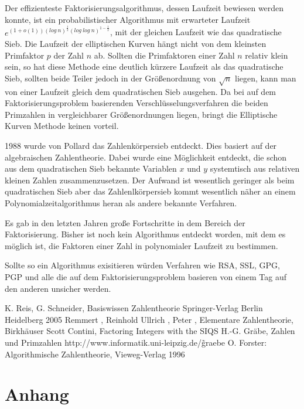 \documentclass[10pt, bigheadings]{scrartcl}
\begin{document}
Der effizienteste Faktorisierungsalgorithmus, dessen Laufzeit bewiesen
werden konnte, ist ein probabilistischer Algorithmus mit erwarteter
Laufzeit $e^{(1+o(1))(log\ n)^{\frac{1}{2}}(log\ log\ n)^{1-\frac{1}{2}}}$, mit
der gleichen Laufzeit wie das quadratische Sieb. Die Laufzeit der
elliptischen Kurven hängt nicht von dem kleinsten Primfaktor $p$ der
Zahl $n$ ab. Sollten die Primfaktoren einer Zahl $n$ relativ klein
sein, so hat diese Methode eine deutlich kürzere Laufzeit als das
quadratische Sieb, sollten beide Teiler jedoch in der Größenordnung
von $\sqrt{n}$ liegen, kann man von einer Laufzeit gleich dem
quadratischen Sieb ausgehen. Da bei auf dem Faktorisierungsproblem
basierenden Verschlüsselungsverfahren die beiden Primzahlen in
vergleichbarer Größenordnungen liegen, bringt die Elliptische Kurven
Methode keinen vorteil.

1988 wurde von Pollard das Zahlenkörpersieb entdeckt. Dies basiert auf
der algebraischen Zahlentheorie. Dabei wurde eine Möglichkeit entdeckt,
die schon aus dem quadratischen Sieb bekannte Variablen $x$ und $y$
systemtisch aus relativen kleinen Zahlen zusammenzusetzen. Der Aufwand
ist wesentlich geringer als beim quadratischen Sieb aber das Zahlenlkörpersieb
kommt wesentlich näher an einem Polynomialzeitalgorithmus heran als
andere bekannte Verfahren.

Es gab in den letzten Jahren große Fortschritte in dem Bereich der
Faktorisierung. Bisher ist noch kein Algorithmus entdeckt worden, mit
dem es möglich ist, die Faktoren einer Zahl in polynomialer Laufzeit
zu bestimmen.

Sollte so ein Algorithmus exisitieren würden Verfahren wie RSA,
SSL, GPG, PGP und alle die auf dem Faktorisierungsproblem basieren
von einem Tag auf den anderen unsicher werden.

\begin{thebibliography}{99}
 K. Reis, G. Schneider, Basiswissen Zahlentheorie
Springer-Verlag Berlin Heidelberg 2005
 Remmert , Reinhold Ullrich , Peter , Elementare Zahlentheorie,
Birkhäuser
 Scott Contini, Factoring Integers with the SIQS
 H.-G. Gräbe, Zahlen und Primzahlen http://www.informatik.uni-leipzig.de/\~graebe
 O. Forster: Algorithmische Zahlentheorie, Vieweg-Verlag 1996
\end{thebibliography}

\newpage
\section{Anhang}
\end{document}

